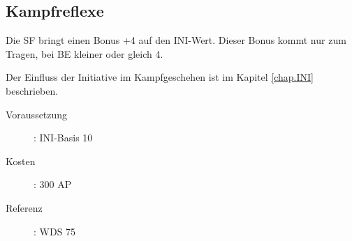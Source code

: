 \subsection{Kampfreflexe}
\label{sf.kampfreflexe}
Die SF  bringt einen Bonus +4 auf den INI-Wert.
Dieser Bonus kommt nur zum Tragen, bei BE kleiner oder gleich 4.

Der Einfluss der Initiative im Kampfgeschehen ist im Kapitel \ref{chap.INI} beschrieben.
\begin{description}
    \item[Voraussetzung]:
        INI-Basis 10
    \item [Kosten]:
        300 AP
    \item [Referenz]:
        WDS 75
\end{description}
